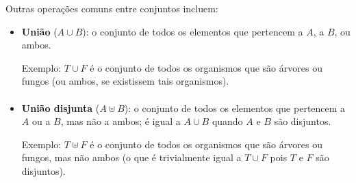 \documentclass[12pt,a4paper]{article}
\begin{document}
Outras operações comuns entre conjuntos incluem:
\begin{itemize}
    \item \textbf{União} (\(A \cup B\)): o conjunto de todos os elementos que pertencem a \(A\), a \(B\), ou ambos.
    
    Exemplo: \(T \cup F\) é o conjunto de todos os organismos que são árvores ou fungos (ou ambos, se existissem tais organismos).
    \begin{center}
    \label{fig:op-uniao}
    \end{center}
    
    \paragraph{}
    \item \textbf{União disjunta} (\(A \uplus B\)): o conjunto de todos os elementos que pertencem a \(A\) ou a \(B\), mas não a ambos; é igual a \(A \cup B\) quando \(A\) e \(B\) são disjuntos.
    
    Exemplo: \(T \uplus F\) é o conjunto de todos os organismos que são árvores ou fungos, mas não ambos (o que é trivialmente igual a \(T \cup F\) pois \(T\) e \(F\) são disjuntos).
    \begin{center}
    \label{fig:op-uniao-disjunta}
    \end{center}


\end{itemize}
\end{document}
